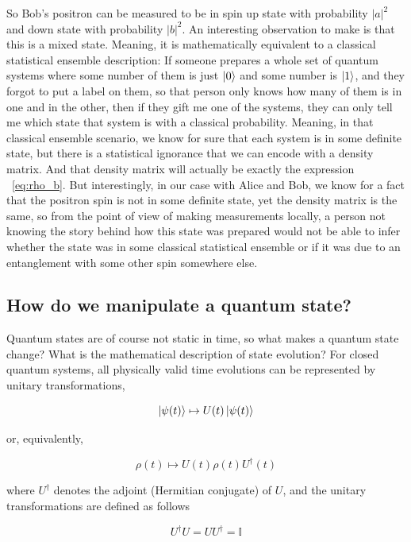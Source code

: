 \documentclass[11pt,a4paper]{article}
\begin{document}
So Bob's positron can be measured to be in spin up state with probability $|a|^2$ and down state with
probability $|b|^2$. An interesting observation to make is that this is a mixed
state. Meaning, it is mathematically equivalent to a classical statistical ensemble description: If
someone prepares a whole set of quantum systems where some number of them is just $\ket{0}$ and some
number is $\ket{1}$, and they forgot to put a label on them, so that person only knows how many of them
is in one and in the other, then if they gift me one of the systems, they can only tell me which state
that system is with a classical probability. Meaning, in that classical ensemble scenario, we know for sure
that each system is in some definite state, but there is a statistical ignorance that we can encode with a
density matrix. And that density matrix will actually be exactly the expression ~\eqref{eq:rho_b}. But
interestingly, in our case with Alice and Bob, we know for a fact that the positron spin is not in some
definite state, yet the density matrix is the same, so from the point of view of making measurements locally,
a person not knowing the story behind how this state was prepared would not be able to infer whether the
state was in some classical statistical ensemble or if it was due to an entanglement with some other spin
somewhere else.

\subsection{How do we manipulate a quantum state?}

Quantum states are of course not static in time, so what makes a quantum state change?
What is the mathematical description of state evolution?
For closed quantum systems, all physically valid time evolutions can be represented
by unitary transformations,

\begin{equation}
    \ket{\psi(t)} \mapsto U(t)\ket{\psi(t)}
\end{equation}

or, equivalently,

\begin{equation}
    \rho(t) \mapsto U(t)\rho(t) U^{\dagger}(t)
\end{equation}

where $U^{\dagger}$ denotes the adjoint (Hermitian conjugate) of $U$, and the unitary transformations
are defined as follows

\begin{equation}
    U^{\dagger}U = UU^{\dagger} = \mathbb{I}
\end{equation}
\end{document}
